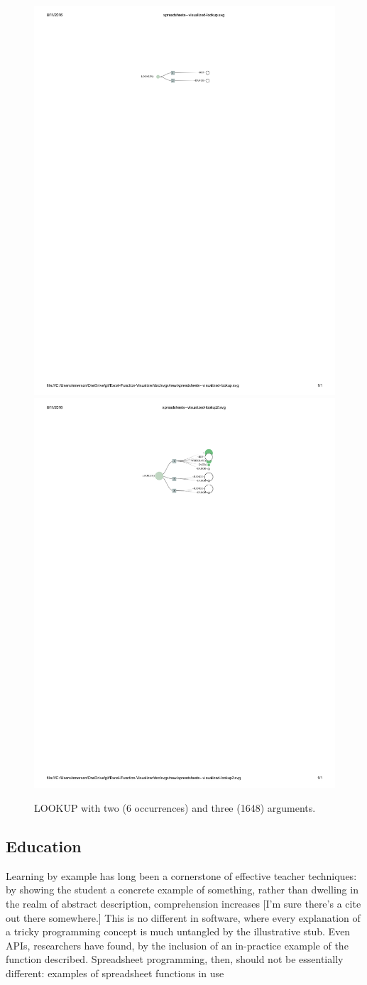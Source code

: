 \documentclass[conference]{IEEEtran}
\begin{document}
	\begin{figure}[h] \centering \includegraphics[width=.5\textwidth]{lookup-2}
		\includegraphics[width=.5\textwidth]{lookup-3} \label{fig:lookups}
		\caption{LOOKUP with two (6 occurrences) and three (1648) arguments.}
	\end{figure}
	
	\subsection{Education} Learning by example has long been a cornerstone of
	effective teacher techniques: by showing the student a concrete example of
	something, rather than dwelling in the realm of abstract description,
	comprehension increases [I'm sure there's a cite out there somewhere.] This is
	no different in software, where every explanation of a tricky programming
	concept is much untangled by the illustrative stub. Even APIs, researchers have
	found, by the inclusion of an in-practice example of the function described.
	Spreadsheet programming, then, should not be essentially different: examples of
	spreadsheet functions in use
	
\end{document}
